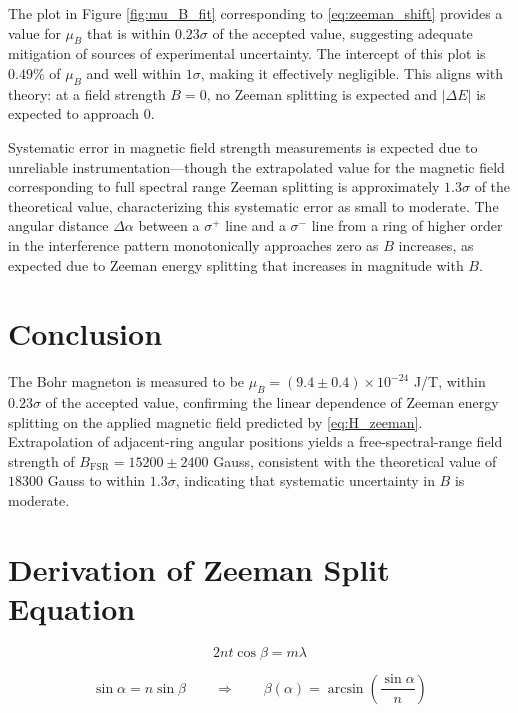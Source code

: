 \documentclass[11pt]{article}
\begin{document}
The plot in Figure \ref{fig:mu_B_fit} corresponding to \eqref{eq:zeeman_shift} provides a value for $\mu_B$ that is within $0.23 \sigma$ of the accepted value, suggesting adequate mitigation of sources of experimental uncertainty. The intercept of this plot is $0.49\%$ of $\mu_B$ and well within $1\sigma$, making it effectively negligible. This aligns with theory: at a field strength $B =0$, no Zeeman splitting is expected and $|\Delta E|$ is expected to approach 0.

Systematic error in magnetic field strength measurements is expected due to unreliable instrumentation---though the extrapolated value for the magnetic field corresponding to full spectral range Zeeman splitting is approximately $1.3\sigma$ of the theoretical value, characterizing this systematic error as small to moderate. The angular distance $\Delta \alpha$ between a $\sigma^+$ line and a $\sigma^-$ line from a ring of higher order in the interference pattern monotonically approaches zero as $B$ increases, as expected due to Zeeman energy splitting that increases in magnitude with $B$.

\section{Conclusion}

The Bohr magneton is measured to be $\mu_B = (9.4 \pm 0.4) \times 10^{-24}$ J/T, within $0.23\sigma$ of the accepted value, confirming the linear dependence of Zeeman energy splitting on the applied magnetic field predicted by \eqref{eq:H_zeeman}. Extrapolation of adjacent-ring angular positions yields a free-spectral-range field strength of $B_{\text{FSR}} = 15200 \pm 2400$ Gauss, consistent with the theoretical value of $18300$ Gauss to within $1.3\sigma$, indicating that systematic uncertainty in $B$ is moderate.




\appendix

\section{Derivation of Zeeman Split Equation}


\[
2 n t \cos\beta = m\lambda
\]

\[
\sin\alpha = n\sin\beta
\qquad\Rightarrow\qquad
\beta(\alpha)=\arcsin\!\left(\frac{\sin\alpha}{n}\right)
\]
\end{document}
